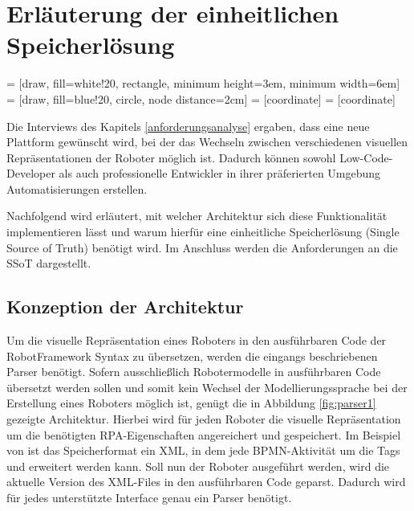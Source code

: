 \section{Erläuterung der einheitlichen Speicherlösung}\label{konzeption_ssot}

 = [draw, fill=white!20, rectangle, 
    minimum height=3em, minimum width=6em]
 = [draw, fill=blue!20, circle, node distance=2cm]
 = [coordinate]
 = [coordinate]
\usetikzlibrary{arrows.meta,arrows}

Die Interviews des Kapitels \ref{anforderungsanalyse} ergaben, dass eine neue Plattform gewünscht wird, bei der das Wechseln zwischen verschiedenen visuellen Repräsentationen der Roboter möglich ist. Dadurch können sowohl Low-Code-Developer als auch professionelle Entwickler in ihrer präferierten Umgebung Automatisierungen erstellen.

Nachfolgend wird erläutert, mit welcher Architektur sich diese Funktionalität implementieren lässt und warum hierfür eine einheitliche Speicherlösung (Single Source of Truth) benötigt wird. Im Anschluss werden die Anforderungen an die SSoT dargestellt.

\subsection{Konzeption der Architektur}

Um die visuelle Repräsentation eines Roboters in den ausführbaren Code der RobotFramework Syntax zu übersetzen, werden die eingangs beschriebenen Parser benötigt. Sofern ausschließlich Robotermodelle in ausführbaren Code übersetzt werden sollen und somit kein Wechsel der Modellierungssprache bei der Erstellung eines Roboters möglich ist, genügt die in Abbildung \ref{fig:parser1} gezeigte Architektur. Hierbei wird für jeden Roboter die visuelle Repräsentation um die benötigten RPA-Eigenschaften angereichert und gespeichert. Im Beispiel von  ist das Speicherformat ein XML, in dem jede BPMN-Aktivität um die Tags  und  erweitert werden kann. Soll nun der Roboter ausgeführt werden, wird die aktuelle Version des XML-Files in den ausführbaren Code geparst. Dadurch wird für jedes unterstützte Interface genau ein Parser benötigt.

